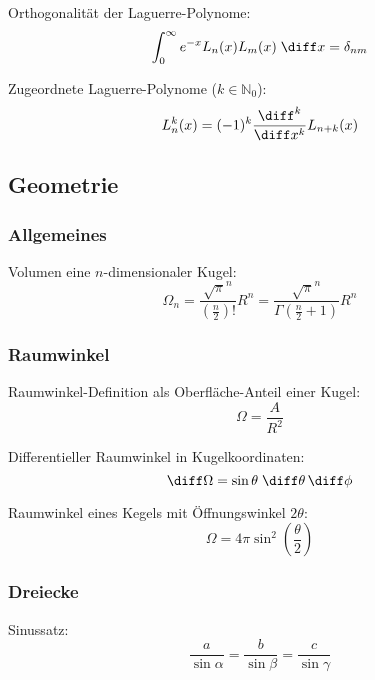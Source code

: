 \documentclass[11pt]{article}
\numberwithin{equation}{section}
\begin{document}
        Orthogonalität der Laguerre-Polynome:
        \begin{equation}
          \int_0^\infty e^{-x} L_n(x) L_m(x)\;\diff x = \delta_{nm}
        \end{equation}

        Zugeordnete Laguerre-Polynome ($k\in\mathbb{N}_0$):
        \begin{equation}
          L_n^k(x) = (-1)^k\frac{\diff^k}{\diff x^k} L_{n+k}(x)
        \end{equation}

    \subsection{Geometrie}
      \subsubsection{Allgemeines}
        Volumen eine $n$-dimensionaler Kugel:
        \begin{equation}
          \Omega_n = \frac{\sqrt{\pi}^n}{\left(\frac{n}{2}\right)!}R^n
            = \frac{\sqrt{\pi}^n}{\Gamma\left(\frac{n}{2}+1\right)}R^n
        \end{equation}


      \subsubsection{Raumwinkel}
        Raumwinkel-Definition als Oberfläche-Anteil einer Kugel:
        \begin{equation}
          \Omega = \frac{A}{R^2}
        \end{equation}

        Differentieller Raumwinkel in Kugelkoordinaten:
        \begin{equation}
          \diff \Omega = \sin\theta\;\diff \theta \,\diff \phi
        \end{equation}

        Raumwinkel eines Kegels mit Öffnungswinkel $2\theta$:
        \begin{equation}
          \Omega = 4\pi\sin^2\left(\frac{\theta}{2}\right)
        \end{equation}

      \subsubsection{Dreiecke}
        Sinussatz:
        \begin{equation}
          \frac{a}{\sin\alpha} = \frac{b}{\sin\beta} = \frac{c}{\sin\gamma}
        \end{equation}
\end{document}
